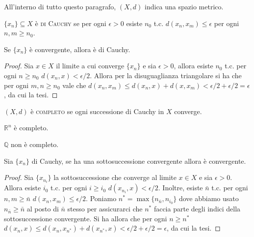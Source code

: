 All'interno di tutto questo paragrafo, $(X, d)$ indica una spazio metrico.

\begin{defn}
  $\{x_n\} \subseteq X$ è \textsc{di Cauchy} se per ogni $\epsilon>0$ esiste $n_0$ t.c. $d(x_n, x_m) \le \epsilon$ per ogni $n, m \ge n_0$.
\end{defn}

\begin{lm} \label{conv->cauchy}
  Se $\{x_n\}$ è convergente, allora è di Cauchy.
\end{lm}

\begin{proof}
  Sia $x \in X$ il limite a cui converge $\{x_n\}$ e sia $\epsilon>0$, allora esiste $n_0$ t.c. per ogni $n \ge n_0$ $d(x_n, x) < \epsilon/2$. Allora per la disuguaglianza triangolare si ha che per ogni $m, n \ge n_0$ vale che $d(x_n, x_m) \le d(x_n, x)+d(x, x_m)<\epsilon/2+\epsilon/2=\epsilon$, da cui la tesi.
\end{proof}

\begin{defn}
  $(X, d)$ è \textsc{completo} se ogni successione di Cauchy in $X$ converge.
\end{defn}

\begin{ex}
  $\mathbb{R}^n$ è completo.
\end{ex}

\begin{ex}
  $\mathbb{Q}$ non è completo.
\end{ex}

\begin{lm}
  Sia $\{x_n\}$ di Cauchy, se ha una sottosuccessione convergente allora è convergente.
\end{lm}

\begin{proof}
  Sia $\{x_{n_i}\}$ la sottosuccessione che converge al limite $x \in X$ e sia $\epsilon>0$. Allora esiste $i_0$ t.c. per ogni $i \ge i_0$ $d(x_{n_i}, x) < \epsilon/2$. Inoltre, esiste $\bar{n}$ t.c. per ogni $n, m \ge \bar{n}$ $d(x_n, x_m) \le \epsilon/2$.
  Poniamo $n^*=\max{\{n_{\bar{n}}, n_{i_0}\}}$ dove abbiamo usato $n_{\bar{n}} \ge \bar{n}$ al posto di $\bar{n}$ stesso per assicurarci che $n^*$ faccia parte degli indici della sottosuccessione convergente.
  Si ha allora che per ogni $n \ge n^*$ $d(x_n, x) \le d(x_n, x_{n^*})+d(x_{n^*} , x)<\epsilon/2+\epsilon/2=\epsilon$, da cui la tesi.
\end{proof}

